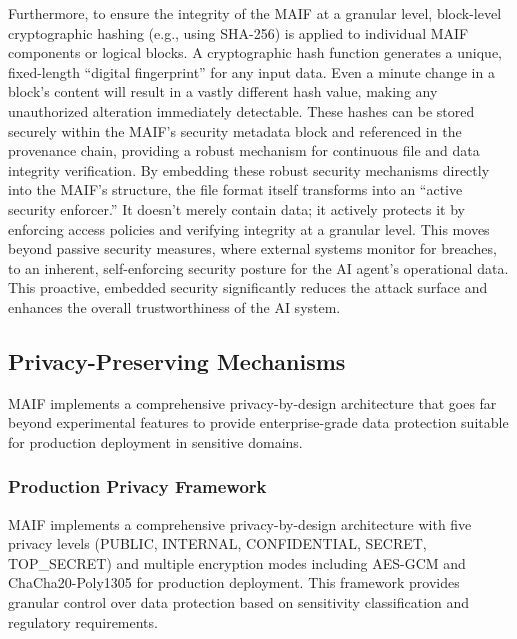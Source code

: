 \documentclass[conference]{IEEEtran}
\begin{document}
Furthermore, to ensure the integrity of the MAIF at a granular level, block-level cryptographic hashing (e.g., using SHA-256) is applied to individual MAIF components or logical blocks\cite{ref72}. A cryptographic hash function generates a unique, fixed-length ``digital fingerprint'' for any input data\cite{ref91}. Even a minute change in a block's content will result in a vastly different hash value, making any unauthorized alteration immediately detectable\cite{ref72}. These hashes can be stored securely within the MAIF's security metadata block and referenced in the provenance chain, providing a robust mechanism for continuous file and data integrity verification. By embedding these robust security mechanisms directly into the MAIF's structure, the file format itself transforms into an ``active security enforcer.'' It doesn't merely contain data; it actively protects it by enforcing access policies and verifying integrity at a granular level. This moves beyond passive security measures, where external systems monitor for breaches, to an inherent, self-enforcing security posture for the AI agent's operational data. This proactive, embedded security significantly reduces the attack surface and enhances the overall trustworthiness of the AI system.

\subsection{Privacy-Preserving Mechanisms}

MAIF implements a comprehensive privacy-by-design architecture that goes far beyond experimental features to provide enterprise-grade data protection suitable for production deployment in sensitive domains.

\subsubsection{Production Privacy Framework}

MAIF implements a comprehensive privacy-by-design architecture with five privacy levels (PUBLIC, INTERNAL, CONFIDENTIAL, SECRET, TOP\_SECRET) and multiple encryption modes including AES-GCM and ChaCha20-Poly1305 for production deployment. This framework provides granular control over data protection based on sensitivity classification and regulatory requirements.
\end{document}

